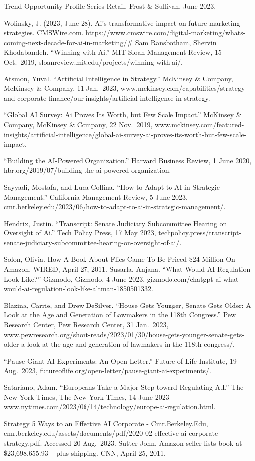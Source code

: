 \documentclass[
]{book}
\begin{document}
Trend Opportunity Profile Series-Retail. Frost \& Sullivan, June 2023.

Wolinsky, J. (2023, June 28). Ai's transformative impact on future marketing strategies. CMSWire.com. \url{https://www.cmswire.com/digital-marketing/whats-coming-next-decade-for-ai-in-marketing/\#}
Sam Ransbotham, Shervin Khodabandeh. ``Winning with Ai.'' MIT Sloan Management Review, 15 Oct.~2019, sloanreview.mit.edu/projects/winning-with-ai/.

Atsmon, Yuval. ``Artificial Intelligence in Strategy.'' McKinsey \& Company, McKinsey \& Company, 11 Jan.~2023, www.mckinsey.com/capabilities/strategy-and-corporate-finance/our-insights/artificial-intelligence-in-strategy.

``Global AI Survey: Ai Proves Its Worth, but Few Scale Impact.'' McKinsey \& Company, McKinsey \& Company, 22 Nov.~2019, www.mckinsey.com/featured-insights/artificial-intelligence/global-ai-survey-ai-proves-its-worth-but-few-scale-impact.

``Building the AI-Powered Organization.'' Harvard Business Review, 1 June 2020, hbr.org/2019/07/building-the-ai-powered-organization.

Sayyadi, Mostafa, and Luca Collina. ``How to Adapt to AI in Strategic Management.'' California Management Review, 5 June 2023, cmr.berkeley.edu/2023/06/how-to-adapt-to-ai-in-strategic-management/.

Hendrix, Justin. ``Transcript: Senate Judiciary Subcommittee Hearing on Oversight of Ai.'' Tech Policy Press, 17 May 2023, techpolicy.press/transcript-senate-judiciary-subcommittee-hearing-on-oversight-of-ai/.

Solon, Olivia. How A Book About Flies Came To Be Priced \$24 Million On Amazon. WIRED, April 27, 2011.
Susarla, Anjana. ``What Would AI Regulation Look Like?'' Gizmodo, Gizmodo, 4 June 2023, gizmodo.com/chatgpt-ai-what-would-ai-regulation-look-like-altman-1850501332.

Blazina, Carrie, and Drew DeSilver. ``House Gets Younger, Senate Gets Older: A Look at the Age and Generation of Lawmakers in the 118th Congress.'' Pew Research Center, Pew Research Center, 31 Jan.~2023, www.pewresearch.org/short-reads/2023/01/30/house-gets-younger-senate-gets-older-a-look-at-the-age-and-generation-of-lawmakers-in-the-118th-congress/.

``Pause Giant AI Experiments: An Open Letter.'' Future of Life Institute, 19 Aug.~2023, futureoflife.org/open-letter/pause-giant-ai-experiments/.

Satariano, Adam. ``Europeans Take a Major Step toward Regulating A.I.'' The New York Times, The New York Times, 14 June 2023, www.nytimes.com/2023/06/14/technology/europe-ai-regulation.html.

Strategy 5 Ways to an Effective AI Corporate - Cmr.Berkeley.Edu, cmr.berkeley.edu/assets/documents/pdf/2020-02-effective-ai-corporate-strategy.pdf. Accessed 20 Aug.~2023.
Sutter John, Amazon seller lists book at \$23,698,655.93 -- plus shipping. CNN, April 25, 2011.

  
\end{document}
